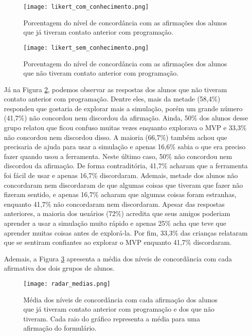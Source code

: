 \begin{figure}[h!]
    \centering
    \texttt{[image: likert\_com\_conhecimento.png]}
    \caption{Porcentagem do nível de concordância com as afirmações dos alunos que já tiveram contato anterior com programação.}
    \label{figure:likert_sim}
\end{figure}

\begin{figure}[h!]
    \centering
    \texttt{[image: likert\_sem\_conhecimento.png]}
    \caption{Porcentagem do nível de concordância com as afirmações dos alunos que não tiveram contato anterior com programação.}
    \label{figure:likert_nao}
\end{figure}


Já na Figura \ref{figure:likert_nao}, podemos observar as respostas dos alunos que não tiveram contato anterior com programação. Dentre eles, mais da metade (58,4\%) respondeu que gostaria de explorar mais a simulação, porém um grande número (41,7\%) não concordou nem discordou da afirmação. Ainda, 50\% dos alunos desse grupo relatou que ficou confuso muitas vezes enquanto explorava o MVP e 33,3\% não concordou nem discordou disso. A maioria (66,7\%) também achou que precisaria de ajuda para usar a simulação e apenas 16,6\% sabia o que era preciso fazer quando usou a ferramenta. Neste último caso, 50\% não concordou nem discordou da afirmação. De forma contraditória, 41,7\% acharam que a ferramenta foi fácil de usar e apenas 16,7\% discordaram. Ademais, metade dos alunos não concordaram nem discordaram de que algumas coisas que tiveram que fazer não fizeram sentido, e apenas 16,7\% acharam que algumas coisas foram estranhas, enquanto 41,7\% não concordaram nem discordaram. Apesar das respostas anteriores, a maioria dos usuários (72\%) acredita que seus amigos poderiam aprender a usar a simulação muito rápido e apenas 25\% acha que teve que aprender muitas coisas antes de explorá-la. Por fim, 33,3\% das crianças relataram que se sentiram confiantes ao explorar o MVP enquanto 41,7\% discordaram.


Ademais, a Figura \ref{figure:radar_medias} apresenta a média dos níveis de concordância com cada afirmativa dos dois grupos de alunos.

\begin{figure}[h!]
    \centering
    \texttt{[image: radar\_medias.png]}
    \caption{Média dos níveis de concordância com cada afirmação dos alunos que já tiveram contato anterior com programação e dos que não tiveram. Cada raio do gráfico representa a média para uma afirmação do formulário.}
    \label{figure:radar_medias}
\end{figure}

